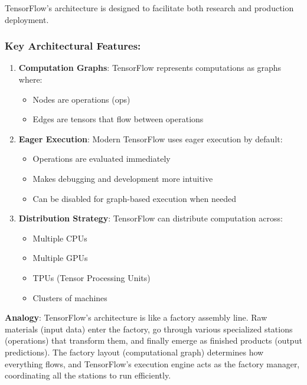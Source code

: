 \documentclass[
  letterpaper,
  DIV=11,
  numbers=noendperiod]{scrreprt}
\providecommand{\tightlist}{%
  \setlength{\itemsep}{0pt}\setlength{\parskip}{0pt}}\usepackage{longtable,booktabs,array}
\begin{document}
TensorFlow's architecture is designed to facilitate both research and
production deployment.

\subsubsection{Key Architectural
Features:}\label{key-architectural-features}

\begin{enumerate}
\def\labelenumi{\arabic{enumi}.}
\tightlist
\item
  \textbf{Computation Graphs}: TensorFlow represents computations as
  graphs where:

  \begin{itemize}
  \tightlist
  \item
    Nodes are operations (ops)
  \item
    Edges are tensors that flow between operations
  \end{itemize}
\item
  \textbf{Eager Execution}: Modern TensorFlow uses eager execution by
  default:

  \begin{itemize}
  \tightlist
  \item
    Operations are evaluated immediately
  \item
    Makes debugging and development more intuitive
  \item
    Can be disabled for graph-based execution when needed
  \end{itemize}
\item
  \textbf{Distribution Strategy}: TensorFlow can distribute computation
  across:

  \begin{itemize}
  \tightlist
  \item
    Multiple CPUs
  \item
    Multiple GPUs
  \item
    TPUs (Tensor Processing Units)
  \item
    Clusters of machines
  \end{itemize}
\end{enumerate}

\textbf{Analogy}: TensorFlow's architecture is like a factory assembly
line. Raw materials (input data) enter the factory, go through various
specialized stations (operations) that transform them, and finally
emerge as finished products (output predictions). The factory layout
(computational graph) determines how everything flows, and TensorFlow's
execution engine acts as the factory manager, coordinating all the
stations to run efficiently.
\end{document}
